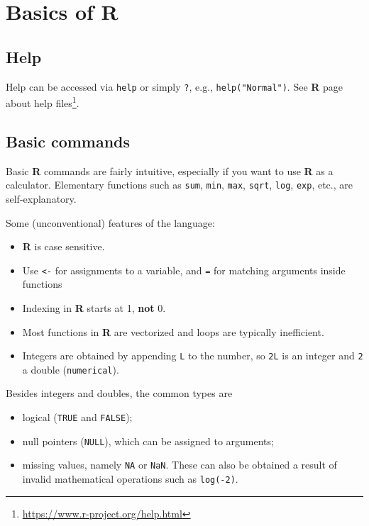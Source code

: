 \documentclass[
  11pt,
  letterpaper,
]{book}
\providecommand{\tightlist}{%
  \setlength{\itemsep}{0pt}\setlength{\parskip}{0pt}}
\renewcommand{\href}[2]{#2\footnote{\url{#1}}}
\theoremstyle{definition}
\theoremstyle{definition}
\theoremstyle{definition}
\theoremstyle{remark}
\begin{document}
\hypertarget{basics-of-r}{%
\section{\texorpdfstring{Basics of \textbf{R}}{Basics of R}}\label{basics-of-r}}

\hypertarget{help}{%
\subsection*{Help}\label{help}}

Help can be accessed via \texttt{help} or simply \texttt{?}, e.g., \texttt{help("Normal")}. \href{https://www.r-project.org/help.html}{See \textbf{R} page about help files}.

\hypertarget{basic-commands}{%
\subsection*{Basic commands}\label{basic-commands}}

Basic \textbf{R} commands are fairly intuitive, especially if you want to use \textbf{R} as a calculator.
Elementary functions such as \texttt{sum}, \texttt{min}, \texttt{max}, \texttt{sqrt}, \texttt{log}, \texttt{exp}, etc., are self-explanatory.

Some (unconventional) features of the language:

\begin{itemize}
\tightlist
\item
  \textbf{R} is case sensitive.
\item
  Use \texttt{\textless{}-} for assignments to a variable, and \texttt{=} for matching arguments inside functions
\item
  Indexing in \textbf{R} starts at 1, \textbf{not} 0.
\item
  Most functions in \textbf{R} are vectorized and loops are typically inefficient.
\item
  Integers are obtained by appending \texttt{L} to the number, so \texttt{2L} is an integer and \texttt{2} a double (\texttt{numerical}).
\end{itemize}

Besides integers and doubles, the common types are

\begin{itemize}
\tightlist
\item
  logical (\texttt{TRUE} and \texttt{FALSE});
\item
  null pointers (\texttt{NULL}), which can be assigned to arguments;
\item
  missing values, namely \texttt{NA} or \texttt{NaN}. These can also be obtained a result of invalid mathematical operations such as \texttt{log(-2)}.
\end{itemize}
\end{document}
